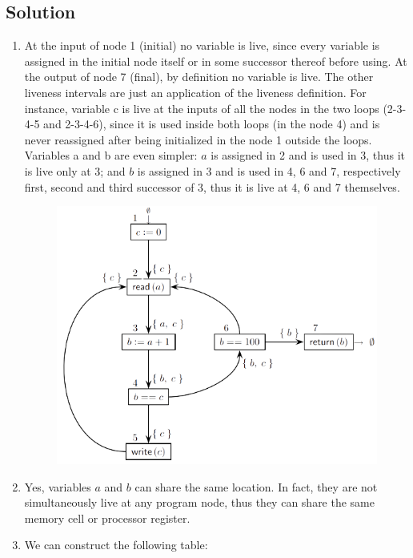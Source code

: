 \documentclass[12pt, a4paper]{report}
\begin{document}
    \subsection*{Solution}
        \begin{enumerate}
            \item At the input of node 1 (initial) no variable is live, since every variable is assigned in the initial node itself or in some successor thereof before using.
                At the output of node 7 (final), by definition no variable is live. The other liveness intervals are just an application of the liveness definition. 
                For instance, variable c is live at the inputs of all the nodes in the two loops (2-3-4-5 and 2-3-4-6), since it is used inside both loops (in the node 4) 
                and is never reassigned after being initialized in the node 1 outside the loops. Variables a and b are even simpler: $a$ is assigned in 2 and is used in 3,
                thus it is live only at 3; and $b$ is assigned in 3 and is used in 4, 6 and 7, respectively first, second and third successor of 3, thus it is live at 4, 6 
                and 7 themselves.
                \begin{figure}[H]
                    \centering
                    \includegraphics[width=0.75\linewidth]{images/CFGlive.png}
                \end{figure} 
            \item Yes, variables $a$ and $b$ can share the same location. In fact, they are not simultaneously live at any program node, thus they can share the same 
                memory cell or processor register.
            \item We can construct the following table: 
                \begin{table}[H]

\end{table}
\end{enumerate}
\end{document}
